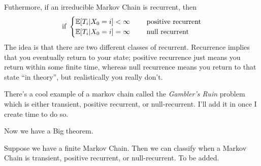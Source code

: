 \documentclass[11 pt]{scrartcl}
\begin{document}
Futhermore, if an irreducible Markov Chain is recurrent, then 
\[ \text{if }
    \begin{cases}
        \mathbb E[T_i | X_0 = i] < \infty \quad &\text{ positive recurrent}  \\
        \mathbb E[T_i | X_0 = i] = \infty \quad &\text{ null recurrent}  
    \end{cases}
\]
The idea is that there are two different classes of recurrent. Recurrence implies that you eventually return to your state; positive recurrence just means you return within some finite time, whereas null recurrence means you return to that state ``in theory'', but realistically you really don't. 

There's a cool example of a markov chain called the \emph{Gambler's Ruin} problem which is either transient, positive recurrent, or null-recurrent. I'll add it in once I create time to do so. 

Now we have a Big theorem. 
\begin{theorem}[Walrand 13.2]
    Suppose we have a finite Markov Chain. Then we can classify when a Markov Chain is transient, positive recurrent, or null-recurrent. To be added. 
\end{theorem}
\end{document}
